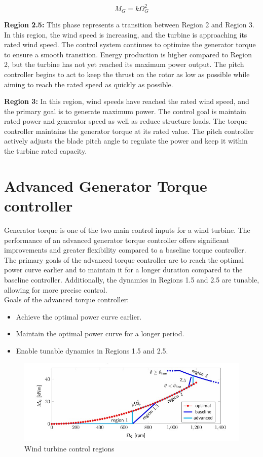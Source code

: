 \begin{equation}
	M_{G} = k\Omega_{G}^2
\end{equation}

\textbf{Region 2.5:} This phase represents a transition between Region 2 and Region 3. In this region, the wind speed is increasing, and the turbine is approaching its rated wind speed. The control system continues to optimize the generator torque to ensure a smooth transition. Energy production is higher compared to Region 2, but the turbine has not yet reached its maximum power output. The pitch controller begins to act to keep the thrust on the rotor as low as possible while aiming to reach the rated speed as quickly as possible.


\textbf{Region 3:} In this region, wind speeds have reached the rated wind speed, and the primary goal is to generate maximum power. The control goal is maintain rated power and generator speed as well as reduce structure loads. The torque controller maintains the generator torque at its rated value. The pitch controller actively adjusts the blade pitch angle to regulate the power and keep it within the turbine rated capacity.

\section{Advanced Generator Torque controller}
Generator torque is one of the two main control inputs for a wind turbine. The performance of an advanced generator torque controller offers significant improvements and greater flexibility compared to a baseline torque controller. The primary goals of the advanced torque controller are to reach the optimal power curve earlier and to maintain it for a longer duration compared to the baseline controller. Additionally, the dynamics in Regions 1.5 and 2.5 are tunable, allowing for more precise control.
\\[16pt]
Goals of the advanced torque controller:

\begin{itemize}
	\item Achieve the optimal power curve earlier.
	\item Maintain the optimal power curve for a longer period.
	\item Enable tunable dynamics in Regions 1.5 and 2.5.
\end{itemize}

\begin{figure}[htbp]
	\centering
	\includegraphics[width=\textwidth]{Figure/Figure_3.jpg}
	\caption{Wind turbine control regions}
\end{figure}

